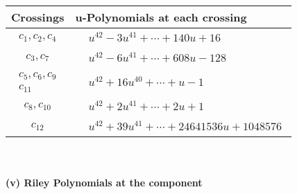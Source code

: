 \documentclass[1p]{elsarticle_modified}
\theoremstyle{definition}
\begin{document}
\begin{tabular}{m{50pt}|m{274pt}}
Crossings & \hspace{64pt}u-Polynomials at each crossing \\
\hline $$\begin{aligned}c_{1},c_{2},c_{4}\end{aligned}$$&$\begin{aligned}
&u^{42}-3 u^{41}+\cdots+140 u+16
\end{aligned}$\\
\hline $$\begin{aligned}c_{3},c_{7}\end{aligned}$$&$\begin{aligned}
&u^{42}-6 u^{41}+\cdots+608 u-128
\end{aligned}$\\
\hline $$\begin{aligned}c_{5},c_{6},c_{9}\\c_{11}\end{aligned}$$&$\begin{aligned}
&u^{42}+16 u^{40}+\cdots+u-1
\end{aligned}$\\
\hline $$\begin{aligned}c_{8},c_{10}\end{aligned}$$&$\begin{aligned}
&u^{42}+2 u^{41}+\cdots+2 u+1
\end{aligned}$\\
\hline $$\begin{aligned}c_{12}\end{aligned}$$&$\begin{aligned}
&u^{42}+39 u^{41}+\cdots+24641536 u+1048576
\end{aligned}$\\
\hline
\end{tabular}\\~\\
\newpage\renewcommand{\arraystretch}{1}
\flushleft \textbf{(v) Riley Polynomials at the component}\newline \\
\end{document}

